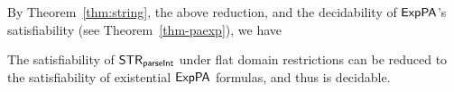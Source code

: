 By Theorem~\ref{thm:string}, the above reduction, and the decidability of ${\sf ExpPA}$'s satisfiability (see Theorem~\ref{thm-paexp}), we have 
\begin{theorem} \label{thm:string-parInt}
    The satisfiability of  ${\sf STR}_{\textsf{parseInt}}$ under flat domain restrictions can be reduced to the satisfiability of existential ${\sf ExpPA}$ formulas, and thus is decidable.
\end{theorem}
